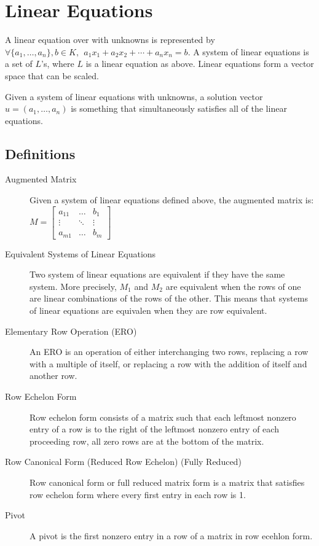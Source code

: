 \section{Linear Equations}

  A linear equation over with unknowns is represented by $\forall \{a_1, \ldots, a_n\}, b \in K,\ \ a_1 x_1 + a_2 x_2 + \cdots + a_n x_n = b$.
  A system of linear equations is a set of $L$'s, where $L$ is a linear equation as above.
  Linear equations form a vector space that can be scaled.
  
  Given a system of linear equations with unknowns, a solution vector $u = (a_1,\ldots, a_n)$ is something that simultaneously satisfies all of the linear equations.
  
  \subsection{Definitions}
  
    \begin{description}
      \item[Augmented Matrix]  Given a system of linear equations defined above, the augmented matrix is:\\
      $M = \left[\begin{array}{cc|c}
        a_{11} & \ldots & b_1 \\
        \vdots & \ddots & \vdots \\
        a_{m1} & \ldots & b_m 
      \end{array}\right]$

      \item[Equivalent Systems of Linear Equations] Two system of linear equations are equivalent if they have the same system.
      More precisely, $M_1$ and $M_2$ are equivalent when the rows of one are linear combinations of the rows of the other. 
      This means that systems of linear equations are equivalen when they are row equivalent.

      \item[Elementary Row Operation (ERO)] An ERO is an operation of either interchanging two rows, replacing a row with a multiple of itself, or replacing a row with the addition of itself and another row.

      \item[Row Echelon Form] Row echelon form consists of a matrix such that each leftmost nonzero entry of a row is to the right of the leftmost nonzero entry of each proceeding row, all zero rows are at the bottom of the matrix.

      \item[Row Canonical Form (Reduced Row Echelon) (Fully Reduced)] Row canonical form or full reduced matrix form is a matrix that satisfies row echelon form where every first entry in each row is 1.

      \item[Pivot] A pivot is the first nonzero entry in a row of a matrix in row ecehlon form.

    \end{description}
  
